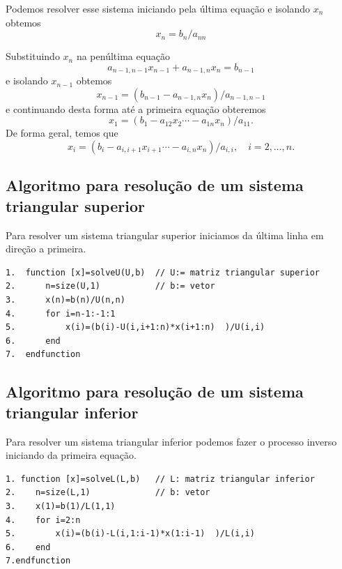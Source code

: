 Podemos resolver esse sistema iniciando pela última equação e isolando $x_n$ obtemos
\begin{equation}
 x_n = b_n/a_{nn}
\end{equation}

Substituindo $x_n$ na penúltima equação
\begin{equation}
 a_{n-1,n-1}x_{n-1}+a_{n-1,n}x_n = b_{n-1}
\end{equation}
e isolando $x_{n-1}$ obtemos
\begin{equation}
 x_{n-1} = (b_{n-1}-a_{n-1,n}x_n)/a_{n-1,n-1}
\end{equation}
e continuando desta forma até a primeira equação obteremos
\begin{equation}
 x_{1} = (b_{1}-a_{12}x_2 \cdots -a_{1n}x_n)/a_{11}.
\end{equation}
De forma geral, temos que
\begin{equation}
 x_{i} = (b_{i}-a_{i,i+1}x_{i+1} \cdots -a_{i,n}x_n)/a_{i,i}, \quad i=2,\dots,n.
\end{equation}



\subsection{Algoritmo para resolução de um sistema triangular superior}

Para resolver um sistema triangular superior iniciamos da última linha em direção a primeira.

\begin{verbatim}
1.  function [x]=solveU(U,b)  // U:= matriz triangular superior
2.      n=size(U,1)           // b:= vetor
3.      x(n)=b(n)/U(n,n)
4.      for i=n-1:-1:1
5.          x(i)=(b(i)-U(i,i+1:n)*x(i+1:n)  )/U(i,i)
6.      end
7.  endfunction

\end{verbatim}

\subsection{Algoritmo para resolução de um sistema triangular inferior}
Para resolver um sistema triangular inferior podemos fazer o processo inverso iniciando da primeira equação.

\begin{verbatim}
1. function [x]=solveL(L,b)   // L: matriz triangular inferior
2.    n=size(L,1)             // b: vetor
3.    x(1)=b(1)/L(1,1)
4.    for i=2:n
5.        x(i)=(b(i)-L(i,1:i-1)*x(1:i-1)  )/L(i,i)
6.    end
7.endfunction
\end{verbatim}


